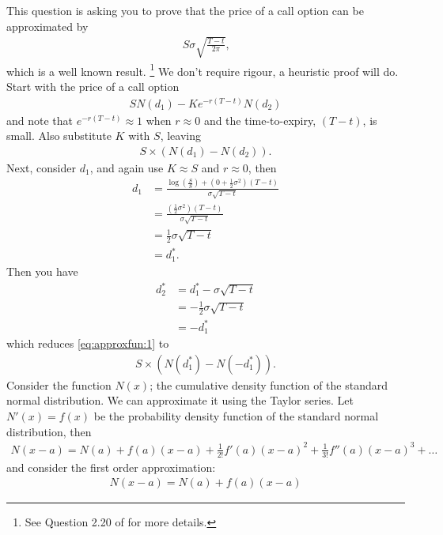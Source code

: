 \documentclass[11pt]{article}
\begin{document}
This question is asking you to prove that the price of a call option can be approximated by
\begin{align*}
  S \sigma \sqrt{\frac{T - t}{2\pi} }
\text{,}
\end{align*}
which is a well known result.%
\footnote{See Question 2.20 of \citet{HeardOnTheStreet} for more details.}
We don't require rigour, a heuristic proof will do.
Start with the price of a call option
\begin{align}
\label{eq:calloption:price}
S N(d_1)
- K e^{-r(T-t)} N(d_2)
\end{align}
and note that $e^{-r(T-t)} \approx 1$ when $r \approx 0$ and the time-to-expiry, $(T-t)$, is small.
Also substitute $K$ with $S$, leaving
\begin{align} \label{eq:approxfun:1}
S \times ( N(d_1) -  N(d_2) )
\text{.}
\end{align}
Next, consider $d_1$, and again use $K \approx S$ and $r \approx 0$, then
\begin{align*}
 d_1
 &=
 \frac{
      \log\left( \frac{S}{S} \right)
      + \left( 0 + \frac{1}{2}\sigma^2  \right)(T - t)
 }{
 \sigma \sqrt{T - t}
 } \\
 &=
 \frac{
      \left(\frac{1}{2}\sigma^2  \right)(T - t)
 }{
 \sigma \sqrt{T - t}
 } \\
 &=
 \frac{1}{2} \sigma \sqrt{T - t}
\\
 &= d_1^*
\text{.}
\end{align*}
Then you have
\begin{align*}
 d_2^* &= d_1^* - \sigma \sqrt{T - t} \\
       &=  -  \frac{1}{2} \sigma \sqrt{T - t} \\
       &=  - d_1^*
\end{align*}
which reduces
\eqref{eq:approxfun:1} to
\begin{align} \label{eq:approxfun:2}
S \times ( N(d_1^*) -  N(-d_1^*) )
\text{.}
\end{align}
Consider the function $N(x)$; the cumulative density function of the standard normal distribution.
We can approximate it using the Taylor series.
Let $N'(x) = f(x)$ be the probability density function of the standard normal distribution, then
\begin{align*}
N(x - a) = N(a)
          + f(a)(x - a)
          + \frac{1}{2!}f'(a)(x - a)^2
          + \frac{1}{3!}f''(a)(x - a)^3
          + \ldots
\end{align*}
and consider the first order approximation:
\begin{align*}
N(x - a) = N(a)
          + f(a)(x - a)
\end{align*}
\end{document}
